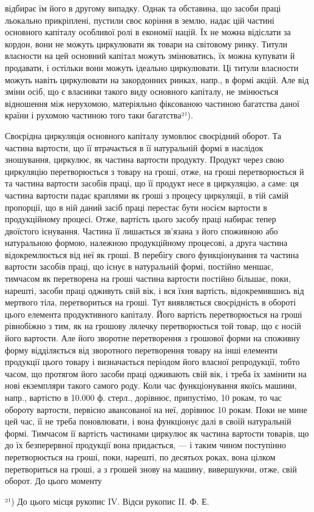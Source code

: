 \parcont{}  %
відбирає їм його в другому випадку. Однак та обставина, що засоби праці льокально прикріплені,
пустили своє коріння в землю, надає цій частині основного капіталу особливої ролі в економії націй.
Їх не можна відіслати за кордон, вони не можуть циркулювати як товари на світовому ринку. Титули
власности на цей основний капітал можуть змінюватись, їх можна купувати й продавати, і остільки вони
можуть ідеально
циркулювати. Ці титули власности можуть навіть циркулювати на закордонних ринках, напр., в формі
акцій. Але від зміни осіб, що є власники такого виду основного капіталу, не змінюється відношення
між нерухомою, матеріяльно фіксованою частиною багатства даної країни і рухомою частиною того таки
багатства²¹).

Своєрідна циркуляція основного капіталу зумовлює своєрідний оборот. Та частина вартости, що її
втрачається в її натуральній формі в наслідок зношування, циркулює, як частина вартости продукту.
Продукт через свою циркуляцію перетворюється з товару на гроші, отже, на гроші перетворюється й та
частина вартости засобів праці, що її продукт несе в циркуляцію, а саме: ця частина вартости падає
краплями як гроші з процесу циркуляції, в тій самій пропорції, що в ній даний засіб праці перестає
бути носієм вартости в продукційному процесі. Отже, вартість цього засобу праці набирає тепер
двоїстого існування. Частина її лишається зв’язана з його споживною або натуральною формою, належною
продукційному процесові, а друга частина відокремлюється від неї як гроші. В перебігу свого
функціонування та частина вартости засобів праці, що існує в натуральній формі, постійно меншає,
тимчасом як перетворена на гроші частина вартости постійно більшає, поки, нарешті, засоби праці
одживуть свій вік, і вся їхня вартість, відокремившись від мертвого тіла, перетвориться на гроші.
Тут виявляється своєрідність в обороті цього елемента продуктивного капіталу. Його вартість
перетворюється на гроші рівнобіжно з тим, як на грошову лялечку перетворюється той товар, що є носій
його вартости. Але його зворотне перетворення з грошової форми на споживну форму відділяється від
зворотного перетворення товару на інші елементи продукції цього товару і визначається періодом його
власної репродукції, тобто часом, що протягом його засоби праці одживають свій вік, і треба їх
замінити на нові екземпляри такого самого роду. Коли час функціонування якоїсь машини, напр.,
вартістю в 10.000 ф. стерл., дорівнює, припустімо, 10 рокам, то час обороту вартости, первісно
авансованої на неї, дорівнює 10 рокам. Поки не мине цей час, її не треба поновлювати, і вона
функціонує далі в своїй натуральній формі. Тимчасом її вартість частинами циркулює як частина
вартости товарів, що до їх безперервної продукції вона придається, — і таким чином поступінно
перетворюється на гроші, поки, нарешті, по десятьох роках, вона цілком перетвориться на гроші, а з
грошей знову на машину, вивершуючи, отже, свій оборот. До цього моменту

²¹) До цього місця рукопис IV. Відси рукопис II. Ф. Е.
\parbreak{}  %

